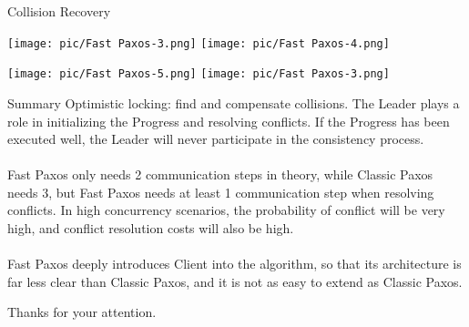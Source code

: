 \documentclass[10pt]{beamer}
\begin{document}
\begin{frame}[fragile]{Collision Recovery}
    \begin{minipage}[t]{0.48\textwidth}
        \centering
        \texttt{[image: pic/Fast Paxos-3.png]}
        \texttt{[image: pic/Fast Paxos-4.png]}
        \caption{Successful Submit}
    \end{minipage}
    \begin{minipage}[t]{0.48\textwidth}
        \centering
        \texttt{[image: pic/Fast Paxos-5.png]}
        \texttt{[image: pic/Fast Paxos-3.png]}
        \caption{Collision Found}
    \end{minipage}
\end{frame}

\begin{frame}[fragile]{Summary}
    Optimistic locking: find and compensate collisions. The Leader plays a role in initializing the Progress and resolving conflicts. If the Progress has been executed well, the Leader will never participate in the consistency process.\\
    ~\\
    Fast Paxos only needs 2 communication steps in theory, while Classic Paxos needs 3, but Fast Paxos needs at least 1 communication step when resolving conflicts. In high concurrency scenarios, the probability of conflict will be very high, and conflict resolution costs will also be high.\\
    ~\\
    Fast Paxos deeply introduces Client into the algorithm, so that its architecture is far less clear than Classic Paxos, and it is not as easy to extend as Classic Paxos.
\end{frame}

\begin{frame}[standout]
    Thanks for your attention.
\end{frame}
\end{document}
